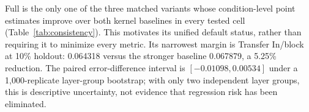 Full is the only one of the three matched variants whose condition-level point estimates improve over both kernel baselines in every tested cell (Table~\ref{tab:consistency}). This motivates its unified default status, rather than requiring it to minimize every metric. Its narrowest margin is Transfer In/block at 10\% holdout: 0.064318 versus the stronger baseline 0.067879, a 5.25\% reduction. The paired error-difference interval is $[-0.01098,0.00534]$ under a 1,000-replicate layer-group bootstrap; with only two independent layer groups, this is descriptive uncertainty, not evidence that regression risk has been eliminated.
